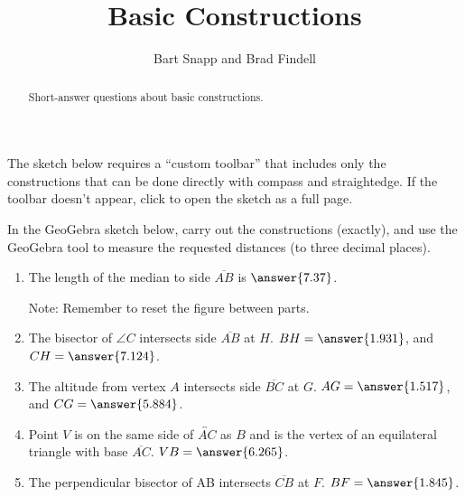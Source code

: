 \documentclass[nooutcomes]{ximera}
\title{Basic Constructions}
\author{Bart Snapp and Brad Findell}
\begin{document}
\begin{abstract}
Short-answer questions about basic constructions. 
\end{abstract}
\maketitle




\begin{warning}
The sketch below requires a ``custom toolbar'' that includes only the constructions that can be done directly with compass and straightedge.  If the toolbar doesn't appear, click 
 to open the sketch as a full page.
\end{warning}
\begin{problem}
In the GeoGebra sketch below, carry out the constructions (exactly), and use the GeoGebra tool to measure the requested distances (to three decimal places).  
\begin{center}  
\end{center}
%
\begin{enumerate}
\item The length of the median to side $\overline{AB}$ 
is $\answer{7.37}$.  

Note: Remember to reset the figure between parts.   

\item The bisector of $\angle C$ intersects side $\overline{AB}$ at $H$.  
$BH =  \answer{1.931}$, and $CH = \answer{7.124}$.  

\item The altitude from vertex $A$ intersects side $\overline{BC}$ at $G$.
$AG = \answer{1.517}$, and 
$CG = \answer{5.884}$.  

\item Point $V$ is on the same side of $\overleftrightarrow{AC}$ as $B$ and is the vertex of an equilateral triangle with base $\overline{AC}$.  
$VB = \answer{6.265}$. 

\item The perpendicular bisector of AB intersects $\overline{CB}$ at $F$.  
$BF = \answer{1.845}$.
\end{enumerate}

\end{problem}
\end{document}
